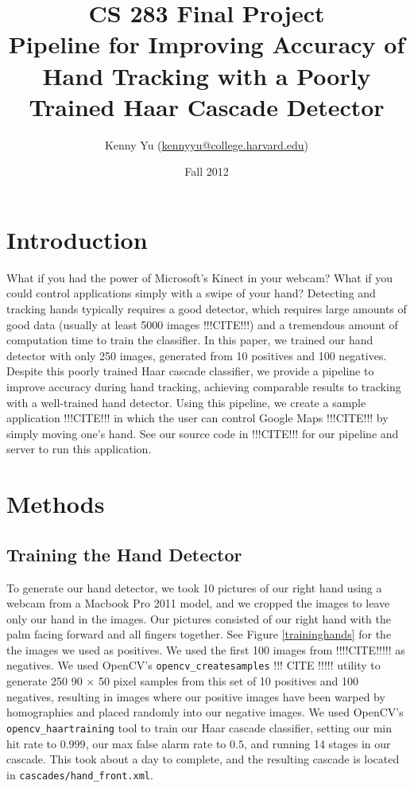 \documentclass[12pt]{article}
\begin{document}
\title{CS 283 Final Project \\ Pipeline for Improving Accuracy of Hand Tracking with a Poorly Trained Haar Cascade Detector}
\date{Fall 2012}
\author{Kenny Yu (\href{mailto:kennyyu@college.harvard.edu}{kennyyu@college.harvard.edu})}
\maketitle

\section{Introduction}
What if you had the power of Microsoft's Kinect in your webcam? What if you could control applications simply with a swipe of your hand? Detecting and tracking hands typically requires a good detector, which requires large amounts of good data (usually at least 5000 images !!!CITE!!!) and a tremendous amount of computation time to train the classifier. In this paper, we trained our hand detector with only 250 images, generated from 10 positives and 100 negatives. Despite this poorly trained Haar cascade classifier, we provide a pipeline to improve accuracy during hand tracking, achieving comparable results to tracking with a well-trained hand detector. Using this pipeline, we create a sample application !!!CITE!!! in which the user can control Google Maps !!!CITE!!! by simply moving one's hand. See our source code in !!!CITE!!! for our pipeline and server to run this application.

\section{Methods}

\subsection{Training the Hand Detector}
To generate our hand detector, we took 10 pictures of our right hand using a webcam from a  Macbook Pro 2011 model, and we cropped the images to leave only our hand in the images. Our pictures consisted of our right hand with the palm facing forward and all fingers together. See Figure \ref{traininghands} for the the images we used as positives. We used the first 100 images from !!!!CITE!!!!! as negatives. We used OpenCV's \texttt{opencv\_createsamples} !!! CITE !!!!! utility to generate 250 90 $\times$ 50 pixel samples from this set of 10 positives and 100 negatives, resulting in images where our positive images have been warped by homographies and placed randomly into our negative images. We used OpenCV's \texttt{opencv\_haartraining} tool to train our Haar cascade classifier, setting our min hit rate to $0.999$, our max false alarm rate to $0.5$, and running 14 stages in our cascade. This took about a day to complete, and the resulting cascade is located in \texttt{cascades/hand\_front.xml}.
\end{document}
